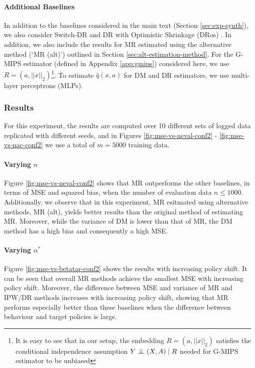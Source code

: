 \paragraph{Additional Baselines}
In addition to the baselines considered in the main text (Section \ref{sec:exp-synth}), we also consider Switch-DR \citep{wang2017optimal} and DR with Optimistic Shrinkage (DRos) \citep{su2020doubly}. In addition, we also include the results for MR estimated using the alternative method (`MR (alt)') outlined in Section \ref{sec:alt-estimation-method}. For the G-MIPS estimator (defined in Appendix \ref{app:gmips}) considered here, we use $R = (a, ||x||_2)$\footnote{It is easy to see that in our setup, the embedding $R = (a, ||x||_2)$ satisfies the conditional independence assumption $Y \perp \!\!\! \perp (X, A) \mid R$ needed for G-MIPS estimator to be unbiased}. 
To estimate $\hat{q}(x, a)$ for DM and DR estimators, we use multi-layer perceptrons (MLPs).


\subsubsection{Results}
For this experiment, the results are computed over 10 different sets of logged data replicated with different seeds, and in Figures \ref{fig:mse-vs-neval-conf2} - \ref{fig:mse-vs-nac-conf2} we use a total of $m=5000$ training data. 

\paragraph{Varying $n$}
Figure \ref{fig:mse-vs-neval-conf2} shows that MR outperforms the other baselines, in terms of MSE and squared bias, when the number of evaluation data $n\leq 1000$. Additionally, we observe that in this experiment, MR esitmated using alternative methods, MR (alt), yields better results than the original method of estimating MR. Moreover, while the variance of DM is lower than that of MR, the DM method has a high bias and consequently a high MSE.

\paragraph{Varying $\alpha^\ast$}
Figure \ref{fig:mse-vs-betatar-conf2} shows the results with increasing policy shift. It can be seen that overall MR methods achieve the smallest MSE with increasing policy shift. Moreover, the difference between MSE and variance of MR and IPW/DR methods increases with increasing policy shift, showing that MR performs especially better than these baselines when the difference between behaviour and target policies is large.


